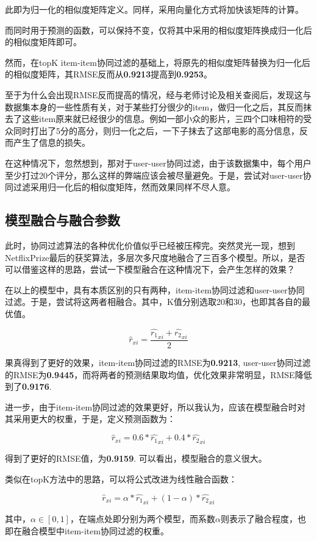 \documentclass[utf8, a4paper, 11pt, onecolumn]{ctexart}
\begin{document}
\begin{spacing}{1.3}
此即为归一化的相似度矩阵定义。同样，采用向量化方式将加快该矩阵的计算。

而同时用于预测的函数，可以保持不变，仅将其中采用的相似度矩阵换成归一化后的相似度矩阵即可。

然而，在topK item-item协同过滤的基础上，将原先的相似度矩阵替换为归一化后的相似度矩阵，其RMSE反而从\textbf{0.9213}提高到\textbf{0.9253}。

至于为什么会出现RMSE反而提高的情况，经与老师讨论及相关查阅后，发现这与数据集本身的一些性质有关，对于某些打分很少的item，做归一化之后，其反而抹去了这些item原来就已经很少的信息。例如一部小众的影片，三四个口味相符的受众同时打出了5分的高分，则归一化之后，一下子抹去了这部电影的高分信息，反而产生了信息的损失。

在这种情况下，忽然想到，那对于user-user协同过滤，由于该数据集中，每个用户至少打过20个评分，那么这样的弊端应该会被尽量避免。于是，尝试对user-user协同过滤采用归一化后的相似度矩阵，然而效果同样不尽人意。


\subsection{模型融合与融合参数}

此时，协同过滤算法的各种优化价值似乎已经被压榨完。突然灵光一现，想到NetflixPrize最后的获奖算法，多层次多尺度地融合了三百多个模型。所以，是否可以借鉴这样的思路，尝试一下模型融合在这种情况下，会产生怎样的效果？

在以上的模型中，具有本质区别的只有两种，item-item协同过滤和user-user协同过滤。于是，尝试将这两者相融合。其中，K值分别选取20和30，也即其各自的最优值。

\[\hat{r}_{xi} = \frac{\hat{r_1}_{xi} + \hat{r_2}_{xi}}{2}\]

果真得到了更好的效果，item-item协同过滤的RMSE为\textbf{0.9213}, user-user协同过滤的RMSE为\textbf{0.9445}，而将两者的预测结果取均值，优化效果非常明显，RMSE降低到了\textbf{0.9176}.

进一步，由于item-item协同过滤的效果更好，所以我认为，应该在模型融合时对其采用更大的权重，于是，定义预测函数为：

\[\hat{r}_{xi} = 0.6 * \hat{r_1}_{xi} + 0.4 * \hat{r_2}_{xi}\]

得到了更好的RMSE值，为\textbf{0.9159}. 可以看出，模型融合的意义很大。

类似在topK方法中的思路，可以将公式改进为线性融合函数：

\[\hat{r}_{xi} = \alpha * \hat{r_1}_{xi} + (1-\alpha) * \hat{r_2}_{xi}\]

其中，$\alpha \in [0, 1]$，在端点处即分别为两个模型，而系数$\alpha$则表示了融合程度，也即在融合模型中item-item协同过滤的权重。


\end{spacing}
\end{document}
